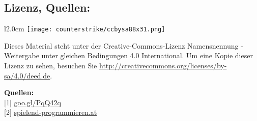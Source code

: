 \documentclass[10pt,a4paper,ngerman,twoside]{article} %
\newcommand{\SepRule}{\noindent	%
\begin{center}
\rule{250pt}{1pt} %
\end{center}
}
\begin{document}
\subsection*{Lizenz, Quellen:}

\begin{wrapfigure}{l}{2.0cm}
\texttt{[image: counterstrike/ccbysa88x31.png]}
\end{wrapfigure}
Dieses Material steht unter der Creative-Commons-Lizenz Namensnennung - Weitergabe unter gleichen Bedingungen 4.0 International. Um eine Kopie dieser Lizenz zu sehen, besuchen Sie \url{http://creativecommons.org/licenses/by-sa/4.0/deed.de}.

\textbf{Quellen:} \\
{[}1{]} \href{https://plus.google.com/108488461844417773815/about}{goo.gl/PqQ42q} \\ %
{[}2{]} \href{http://spielend-programmieren.at}{spielend-programmieren.at} \\








\end{document}
